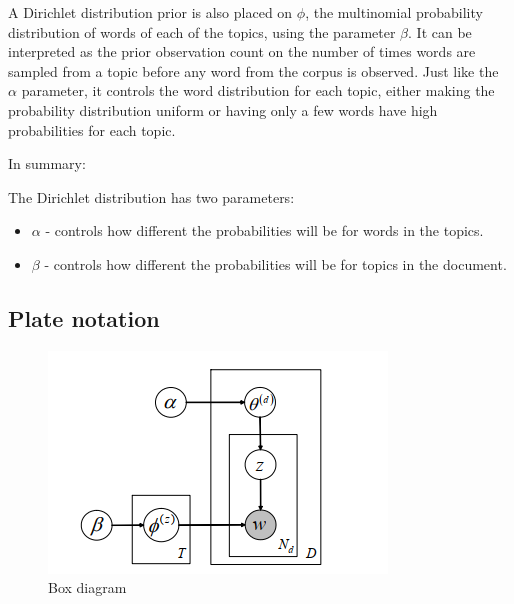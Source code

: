\documentclass[
]{article}
\providecommand{\tightlist}{%
  \setlength{\itemsep}{0pt}\setlength{\parskip}{0pt}}
\begin{document}
A Dirichlet distribution prior is also placed on \(\phi\), the
multinomial probability distribution of words of each of the topics,
using the parameter \(\beta\). It can be interpreted as the prior
observation count on the number of times words are sampled from a topic
before any word from the corpus is observed. Just like the \(\alpha\)
parameter, it controls the word distribution for each topic, either
making the probability distribution uniform or having only a few words
have high probabilities for each topic.

In summary:

The Dirichlet distribution has two parameters:

\begin{itemize}
\tightlist
\item
  \(\alpha\) - controls how different the probabilities will be for
  words in the topics.
\item
  \(\beta\) - controls how different the probabilities will be for
  topics in the document.
\end{itemize}

\hypertarget{plate-notation}{%
\subsection{Plate notation}\label{plate-notation}}

\begin{figure}

{\centering \includegraphics[width=1\linewidth]{images/Box diagram} 

}

\caption{Box diagram}\label{fig:boxdia}
\end{figure}
\end{document}
